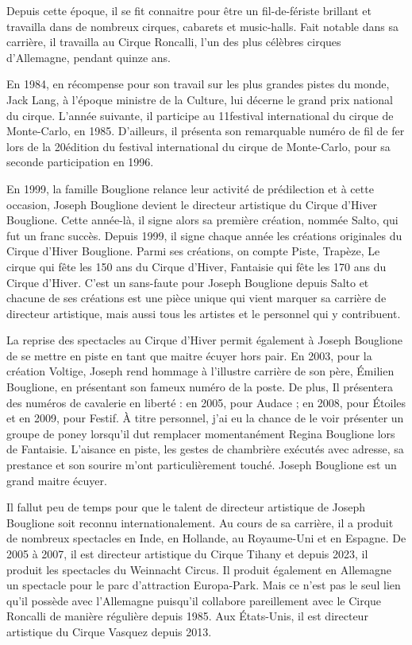 Depuis cette époque, il se fit connaitre pour être un fil-de-fériste brillant et travailla dans de nombreux cirques, cabarets et music-halls. Fait notable dans sa carrière, il travailla au Cirque Roncalli, l’un des plus célèbres cirques d’Allemagne, pendant quinze ans.

En 1984, en récompense pour son travail sur les plus grandes pistes du monde, Jack Lang, à l’époque ministre de la Culture, lui décerne le grand prix national du cirque. L’année suivante, il participe au 11\ieme festival international du cirque de Monte-Carlo, en 1985. D’ailleurs, il présenta son remarquable numéro de fil de fer lors de la 20\ieme édition du festival international du cirque de Monte-Carlo, pour sa seconde participation en 1996.

En 1999, la famille Bouglione relance leur activité de prédilection et à cette occasion, Joseph Bouglione devient le directeur artistique du Cirque d'Hiver Bouglione. Cette année-là, il signe alors sa première création, nommée Salto, qui fut un franc succès. Depuis 1999, il signe chaque année les créations originales du Cirque d’Hiver Bouglione. Parmi ses créations, on compte Piste, Trapèze, Le cirque qui fête les 150 ans du Cirque d'Hiver, Fantaisie qui fête les 170 ans du Cirque d’Hiver. C’est un sans-faute pour Joseph Bouglione depuis Salto et chacune de ses créations est une pièce unique qui vient marquer sa carrière de directeur artistique, mais aussi tous les artistes et le personnel qui y contribuent.

La reprise des spectacles au Cirque d’Hiver permit également à Joseph Bouglione de se mettre en piste en tant que maitre écuyer hors pair. En 2003, pour la création Voltige, Joseph rend hommage à l’illustre carrière de son père, Émilien Bouglione, en présentant son fameux numéro de la poste. De plus, Il présentera des numéros de cavalerie en liberté : en 2005, pour Audace ; en 2008, pour Étoiles et en 2009, pour Festif. À titre personnel, j’ai eu la chance de le voir présenter un groupe de poney lorsqu’il dut remplacer momentanément Regina Bouglione lors de Fantaisie. L’aisance en piste, les gestes de chambrière exécutés avec adresse, sa prestance et son sourire m’ont particulièrement touché. Joseph Bouglione est un grand maitre écuyer.

Il fallut peu de temps pour que le talent de directeur artistique de Joseph Bouglione soit reconnu internationalement. Au cours de sa carrière, il a produit de nombreux spectacles en Inde, en Hollande, au Royaume-Uni et en Espagne. De 2005 à 2007, il est directeur artistique du Cirque Tihany et depuis 2023, il produit les spectacles du Weinnacht Circus. Il produit également en Allemagne un spectacle pour le parc d'attraction Europa-Park. Mais ce n’est pas le seul lien qu’il possède avec l’Allemagne puisqu’il collabore pareillement avec le Cirque Roncalli de manière régulière depuis 1985. Aux États-Unis, il est directeur artistique du Cirque Vasquez depuis 2013.

